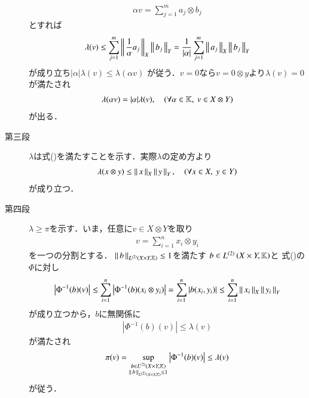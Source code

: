 \begin{prf}
\begin{description}
				\begin{align}
					\alpha v = \sum_{j=1}^m a_j \otimes b_j
				\end{align}
				とすれば
				\begin{align}
					\lambda(v) \leq \sum_{j=1}^m \Norm{\frac{1}{\alpha}a_j}{X} \Norm{b_j}{Y}
					= \frac{1}{|\alpha|} \sum_{j=1}^m \Norm{a_j}{X} \Norm{b_j}{Y}
				\end{align}
				が成り立ち$|\alpha| \lambda(v) \leq \lambda(\alpha v)$
				が従う．$v=0$なら$v = 0 \otimes y$より$\lambda(v) = 0$が満たされ
				\begin{align}
					\lambda(\alpha v) = |\alpha| \lambda(v),
					\quad (\forall \alpha \in \K,\ v \in X \otimes Y)
				\end{align}
				が出る．
				
			\item[第三段]
				$\lambda$は式()を満たすことを示す．実際$\lambda$の定め方より
				\begin{align}
					\lambda(x \otimes y) \leq \Norm{x}{X} \Norm{y}{Y},
					\quad (\forall x \in X,\ y \in Y)
				\end{align}
				が成り立つ．
				
			\item[第四段]
				$\lambda \geq \pi$を示す．いま，任意に$v \in X \otimes Y$を取り
				\begin{align}
					v = \sum_{i=1}^{n} x_i \otimes y_i
				\end{align}
				を一つの分割とする．
				$\Norm{b}{\ContLn{X \times Y}{\K}{2}} \leq 1$を満たす
				$b \in \ContLn{X \times Y}{\K}{2}$と
				式()の
				$\Phi$に対し
				\begin{align}
					\left| \Phi^{-1}(b)(v) \right|
					\leq \sum_{i=1}^{n} \left| \Phi^{-1}(b)(x_i \otimes y_i) \right|
					= \sum_{i=1}^{n} \left| b(x_i,y_i) \right|
					\leq \sum_{i=1}^{n} \Norm{x_i}{X} \Norm{y_i}{Y}
				\end{align}
				が成り立つから，$b$に無関係に
				\begin{align}
					\left| \Phi^{-1}(b)(v) \right| \leq \lambda(v)
				\end{align}
				が満たされ
				\begin{align}
					\pi(v) = \sup{\substack{b \in \ContLn{X \times Y}{\K}{2} \\ \Norm{b}{\ContLn{X \times Y}{\K}{2}} \leq 1}}{\left| \Phi^{-1}(b)(v) \right|}
					\leq \lambda(v)
				\end{align}
				が従う．
				\QED
		\end{description}
	\end{prf}
	
